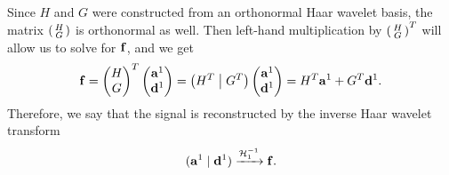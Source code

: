 \documentclass{article}
\theoremstyle{definition}
\begin{document}
  Since \(H\) and \(G\) were constructed from an orthonormal Haar wavelet basis, the matrix \(\smqty(H \\ G)\) is orthonormal as well. Then left-hand multiplication by \(\smqty(H \\ G)^T\) will allow us to solve for \(\vb{f}\), and we get
  \begin{equation}
    \vb{f} =
    \begin{pmatrix}
      H \\ G
    \end{pmatrix}^T
    \begin{pmatrix}
      \vb{a}^1 \\ \vb{d}^1
    \end{pmatrix} =
    \left(H^T \;\middle|\; G^T\right)
    \begin{pmatrix}
      \vb{a}^1 \\ \vb{d}^1
    \end{pmatrix} =
    H^T \vb{a}^1 + G^T \vb{d}^1.
  \end{equation}
  Therefore, we say that the signal is reconstructed by the inverse Haar wavelet transform
  \begin{equation}
    (\vb{a}^1 \mid \vb{d}^1)  \xrightarrow{\mathcal{H}^{-1}_1} \vb{f}.
  \end{equation}
\end{document}
